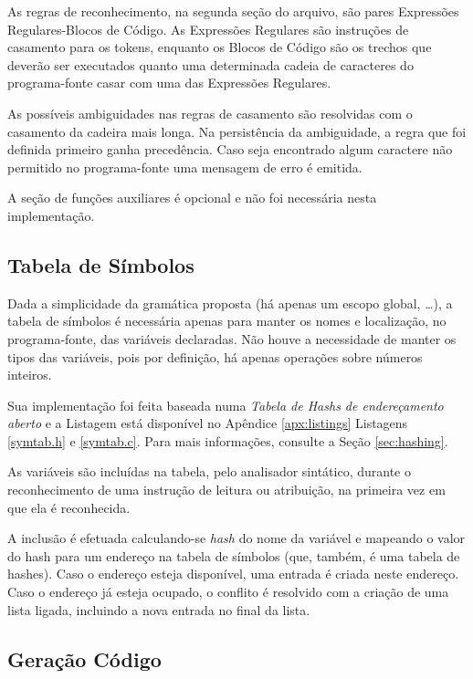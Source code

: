As regras de reconhecimento, na segunda seção do arquivo, são pares Expressões
Regulares-Blocos de Código. As Expressões Regulares são instruções de
casamento para os tokens, enquanto os Blocos de Código são os trechos que
deverão ser executados quanto uma determinada cadeia de caracteres do
programa-fonte casar com uma das Expressões Regulares.

As possíveis ambiguidades nas regras de casamento são resolvidas com o
casamento da cadeira mais longa. Na persistência da ambiguidade, a regra que
foi definida primeiro ganha precedência. Caso seja encontrado algum caractere
não permitido no programa-fonte uma mensagem de erro é emitida.

A seção de funções auxiliares é opcional e não foi necessária nesta
implementação.


\subsection{Tabela de Símbolos}
\label{sec:implement_symtab}

Dada a simplicidade da gramática proposta (há apenas um escopo global,
\dots), a tabela de símbolos é necessária apenas para manter os nomes e
localização, no programa-fonte, das variáveis declaradas. Não houve a
necessidade de manter os tipos das variáveis, pois por definição, há
apenas operações sobre números inteiros.

Sua implementação foi feita baseada numa \emph{Tabela de Hashs de
endereçamento aberto} e a Listagem está disponível no Apêndice
\ref{apx:listings} Listagens \ref{symtab.h} e \ref{symtab.c}. Para
mais informações, consulte a Seção \ref{sec:hashing}.

As variáveis são incluídas na tabela, pelo analisador sintático, durante o
reconhecimento de uma instrução de leitura ou atribuição, na primeira vez em
que ela é reconhecida.

A inclusão é efetuada calculando-se \emph{hash} do nome da variável e mapeando
o valor do hash para um endereço na tabela de símbolos (que, também, é uma
tabela de hashes). Caso o endereço esteja disponível, uma entrada é criada
neste endereço. Caso o endereço já esteja ocupado, o conflito é resolvido com
a criação de uma lista ligada, incluindo a nova entrada no final da lista.

\subsection{Geração Código}
\label{sec:gencode}

